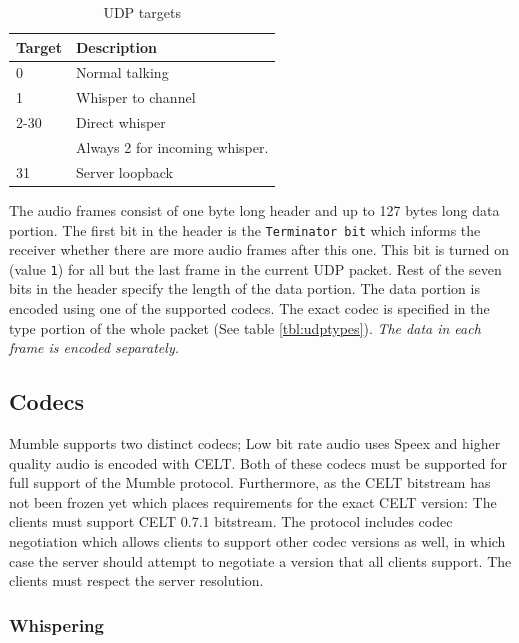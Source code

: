 \documentclass[11pt]{article} %
\begin{document}
\begin{table}[H]\begin{center}
	\caption{UDP targets}\label{tbl:udptargets}

	\begin{tabular}{ll}
		Target & Description \\
		\hline
		0	& Normal talking \\
		1	& Whisper to channel \\
		2-30	& Direct whisper \\
			& Always 2 for incoming whisper. \\
		31	& Server loopback
	\end{tabular}
\end{center}\end{table}

The audio frames consist of one byte long header and up to 127 bytes long data portion. The first bit in the header is the \texttt{Terminator bit} which informs the receiver whether there are more audio frames after this one. This bit is turned on (value \texttt{1}) for all but the last frame in the current UDP packet. Rest of the seven bits in the header specify the length of the data portion. The data portion is encoded using one of the supported codecs. The exact codec is specified in the type portion of the whole packet (See table \ref{tbl:udptypes}). \emph{The data in each frame is encoded separately.}

\subsection{Codecs}
\label{sect:codecs}

Mumble supports two distinct codecs; Low bit rate audio uses Speex and higher quality audio is encoded with CELT. Both of these codecs must be supported for full support of the Mumble protocol. Furthermore, as the CELT bitstream has not been frozen yet which places requirements for the exact CELT version: The clients must support CELT 0.7.1 bitstream. The protocol includes codec negotiation which allows clients to support other codec versions as well, in which case the server should attempt to negotiate a version that all clients support. The clients must respect the server resolution.

\subsubsection{Whispering}
\label{sect:whispering}
\end{document}
